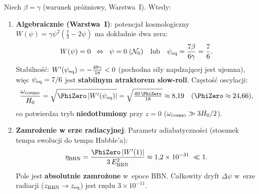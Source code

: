 \begin{proposition}[Warunek pocz\k{a}tkowy $\psi_{\rm ini} = 7/6$
  jako Warstwa~I$\to$III --- \statuslabel{Propozycja}]%
\label{prop:psi-ini-derived}
Niech $\beta = \gamma$ (warunek pr\'o\.zniowy, Warstwa~I).
Wtedy:
\begin{enumerate}[nosep]
  \item \textbf{Algebraicznie (Warstwa~I)}:
    potencja\l{} kosmologiczny $W(\psi) = \gamma\psi^2(\tfrac{7}{3} - 2\psi)$
    ma dok\l{}adnie dwa zera:
    \begin{equation}\label{eq:W-zeros}
      W(\psi) = 0 \;\;\Leftrightarrow\;\;
      \psi = 0 \;(\mathcal{N}_0)
      \quad\text{lub}\quad
      \psi_{\rm eq} = \frac{7\beta}{6\gamma} = \frac{7}{6}.
    \end{equation}
    Stabilno\'s\'c: $W'(\psi_{\rm eq}) = -\tfrac{49\gamma}{18} < 0$
    (pochodna si\l{}y napdzaj\k{a}cej jest ujemna),
    wi\k{e}c $\psi_{\rm eq} = 7/6$ jest \textbf{stabilnym atraktorem slow-roll}.
    Cz\k{e}sto\'s\'c oscylacji:
    \begin{equation}\label{eq:omega-cosmo}
      \frac{\omega_{\rm cosmo}}{H_0}
      = \sqrt{\PhiZero\,|W'(\psi_{\rm eq})|}
      = \sqrt{\tfrac{49\,\PhiZero}{18}}
      \approx 8{,}19
      \quad (\PhiZero \approx 24{,}66),
    \end{equation}
    co potwierdza tryb \textbf{niedot\l{}umiony} przy $z = 0$
    ($\omega_{\rm cosmo} \gg 3H_0/2$).

  \item \textbf{Zamro\.zenie w erze radiacyjnej}:
    Parametr adiabatyczno\'sci (stosunek tempa ewolucji
    do tempa Hubble'a):
    \begin{equation}\label{eq:eta-BBN}
      \eta_{\rm BBN}
      = \frac{\PhiZero\,|W'(1)|}{3\,E_{\rm BBN}^2}
      \approx 1{,}2 \times 10^{-31}
      \;\ll 1.
    \end{equation}
    Pole jest \textbf{absolutnie zamro\.zone} w~epoce BBN.
    Ca\l{}kowity dryft $\Delta\psi$ w~erze radiacji
    ($z_{\rm BBN} \to z_{\rm eq}$) jest rz\k{e}du $3 \times 10^{-11}$.


\end{enumerate}
\end{proposition}
